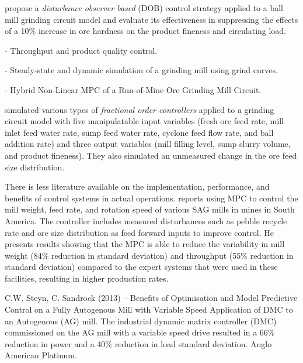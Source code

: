 \cite{chen_disturbance_2009} propose a \textit{disturbance observer based} (DOB) control strategy applied to a ball mill grinding circuit model and evaluate its effectiveness in suppressing the effects of a 10\% increase in ore hardness on the product fineness and circulating load.


\cite{le_roux_throughput_2016} - Throughput and product quality control.

\cite{le_roux_steady-state_2020} - Steady-state and dynamic simulation of a grinding mill using grind curves.

\cite{botha_hybrid_2018} - Hybrid Non-Linear MPC of a Run-of-Mine Ore Grinding Mill Circuit.

\cite{aguila-camacho_control_2017} simulated various types of \textit{fractional order controllers} applied to a grinding circuit model with five manipulatable input variables (fresh ore feed rate, mill inlet feed water rate, sump feed water rate, cyclone feed flow rate, and ball addition rate) and three output variables (mill filling level, sump slurry volume, and product fineness). They also simulated an unmeasured change in the ore feed size distribution.

There is less literature available on the implementation, performance, and benefits of control systems in actual operations. \cite{gough_sag_2015} reports using MPC to control the mill weight, feed rate, and rotation speed of various SAG mills in mines in South America. The controller includes measured disturbances such as pebble recycle rate and ore size distribution as feed forward inputs to improve control. He presents results showing that the MPC is able to reduce the variability in mill weight (84\% reduction in standard deviation) and throughput (55\% reduction in standard deviation) compared to the expert systems that were used in these facilities, resulting in higher production rates.

C.W. Steyn, C. Sandrock (2013) – Benefits of Optimisation and Model Predictive Control on a Fully Autogenous Mill with Variable Speed Application of DMC to an Autogenous (AG) mill. The industrial dynamic matrix controller (DMC) commissioned on the AG mill with a variable speed drive resulted in a 66\% reduction in power and a 40\% reduction in load standard deviation. Anglo American Platinum.


